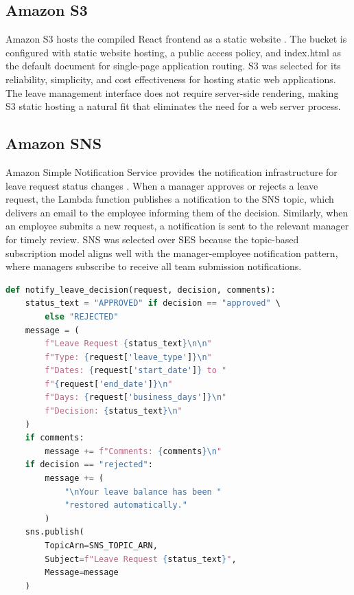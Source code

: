 \documentclass[conference]{IEEEtran}
\begin{document}
\subsection{Amazon S3}

Amazon S3 hosts the compiled React frontend as a static website \cite{awss3}. The bucket is configured with static website hosting, a public access policy, and index.html as the default document for single-page application routing. S3 was selected for its reliability, simplicity, and cost effectiveness for hosting static web applications. The leave management interface does not require server-side rendering, making S3 static hosting a natural fit that eliminates the need for a web server process.

\subsection{Amazon SNS}

Amazon Simple Notification Service provides the notification infrastructure for leave request status changes \cite{awssns}. When a manager approves or rejects a leave request, the Lambda function publishes a notification to the SNS topic, which delivers an email to the employee informing them of the decision. Similarly, when an employee submits a new request, a notification is sent to the relevant manager for timely review. SNS was selected over SES because the topic-based subscription model aligns well with the manager-employee notification pattern, where managers subscribe to receive all team submission notifications.

\begin{lstlisting}[language=Python, caption={SNS notification on leave approval/rejection}]
def notify_leave_decision(request, decision, comments):
    status_text = "APPROVED" if decision == "approved" \
        else "REJECTED"
    message = (
        f"Leave Request {status_text}\n\n"
        f"Type: {request['leave_type']}\n"
        f"Dates: {request['start_date']} to "
        f"{request['end_date']}\n"
        f"Days: {request['business_days']}\n"
        f"Decision: {status_text}\n"
    )
    if comments:
        message += f"Comments: {comments}\n"
    if decision == "rejected":
        message += (
            "\nYour leave balance has been "
            "restored automatically."
        )
    sns.publish(
        TopicArn=SNS_TOPIC_ARN,
        Subject=f"Leave Request {status_text}",
        Message=message
    )
\end{lstlisting}
\end{document}
